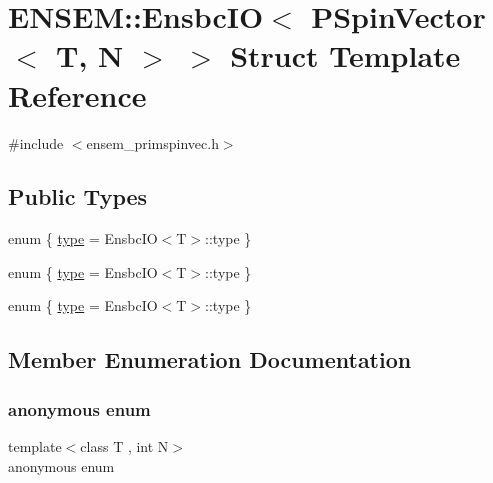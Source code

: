 \hypertarget{structENSEM_1_1EnsbcIO_3_01PSpinVector_3_01T_00_01N_01_4_01_4}{}\section{E\+N\+S\+EM\+:\+:Ensbc\+IO$<$ P\+Spin\+Vector$<$ T, N $>$ $>$ Struct Template Reference}
\label{structENSEM_1_1EnsbcIO_3_01PSpinVector_3_01T_00_01N_01_4_01_4}


{\ttfamily \#include $<$ensem\+\_\+primspinvec.\+h$>$}

\subsection*{Public Types}
\begin{DoxyCompactItemize}
\item 
enum \{ \mbox{\hyperlink{structENSEM_1_1EnsbcIO_3_01PSpinVector_3_01T_00_01N_01_4_01_4_ac42ea570df96d8856be4afb296460802a04e61fa5aa42066e9fedbcc4e35bc62d}{type}} = Ensbc\+IO$<$T$>$\+:\+:type
 \}
\item 
enum \{ \mbox{\hyperlink{structENSEM_1_1EnsbcIO_3_01PSpinVector_3_01T_00_01N_01_4_01_4_ac42ea570df96d8856be4afb296460802a04e61fa5aa42066e9fedbcc4e35bc62d}{type}} = Ensbc\+IO$<$T$>$\+:\+:type
 \}
\item 
enum \{ \mbox{\hyperlink{structENSEM_1_1EnsbcIO_3_01PSpinVector_3_01T_00_01N_01_4_01_4_ac42ea570df96d8856be4afb296460802a04e61fa5aa42066e9fedbcc4e35bc62d}{type}} = Ensbc\+IO$<$T$>$\+:\+:type
 \}
\end{DoxyCompactItemize}


\subsection{Member Enumeration Documentation}
\mbox{\label{structENSEM_1_1EnsbcIO_3_01PSpinVector_3_01T_00_01N_01_4_01_4_a9dfe5a4ae811ba3afad18150e4dc7562}} 
\subsubsection{\texorpdfstring{anonymous enum}{anonymous enum}}
{\footnotesize\ttfamily template$<$class T , int N$>$ \\
anonymous enum}

